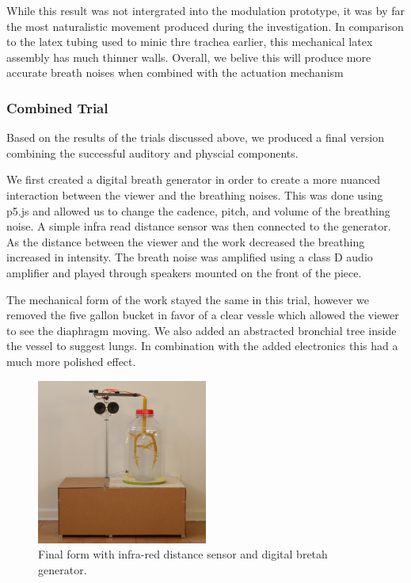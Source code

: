 \documentclass[letterpaper]{article}
\begin{document}
While this result was not intergrated into the modulation prototype, it was by far the most naturalistic movement produced during the investigation. In comparison to the latex tubing used to minic thre trachea earlier, this mechanical latex assembly has much thinner walls. Overall, we belive this will produce more accurate breath noises when combined with the actuation mechanism

\subsubsection{Combined Trial}

Based on the results of the trials discussed above, we produced a final version combining the successful auditory and physcial components.

We first created a digital breath generator in order to create a more nuanced interaction between the viewer and the breathing noises. This was done using p5.js and allowed us to change the cadence, pitch, and volume of the breathing noise. A simple infra read distance sensor was then connected to the generator. As the distance between the viewer and the work decreased the breathing increased in intensity. The breath noise was amplified using a class D audio amplifier and played through speakers mounted on the front of the piece. 
 

The mechanical form of the work stayed the same in this trial, however we removed the five gallon bucket in favor of a clear vessle which allowed the viewer to see the diaphragm moving. We also added an abstracted bronchial tree inside the vessel to suggest lungs. In combination with the added electronics this had a much more polished effect.

\begin{figure}[h]
\includegraphics[width=0.5\textwidth]{images/finaltrial.JPG}
\caption{Final form with infra-red distance sensor and digital bretah generator.}
\end{figure}
\end{document}
